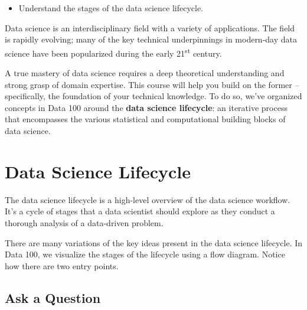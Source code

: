 \documentclass[
  letterpaper,
  DIV=11,
  numbers=noendperiod]{scrreprt}
\providecommand{\tightlist}{%
  \setlength{\itemsep}{0pt}\setlength{\parskip}{0pt}}\usepackage{longtable,booktabs,array}
\begin{document}
\begin{tcolorbox}[enhanced jigsaw, rightrule=.15mm, opacityback=0, colbacktitle=quarto-callout-note-color!10!white, opacitybacktitle=0.6, coltitle=black, toptitle=1mm, colback=white, toprule=.15mm, leftrule=.75mm, breakable, bottomtitle=1mm, bottomrule=.15mm, arc=.35mm, title=\textcolor{quarto-callout-note-color}{\faInfo}\hspace{0.5em}{Note}, colframe=quarto-callout-note-color-frame, titlerule=0mm, left=2mm]

\begin{itemize}
\tightlist
\item
  Understand the stages of the data science lifecycle.
\end{itemize}

\end{tcolorbox}

Data science is an interdisciplinary field with a variety of
applications. The field is rapidly evolving; many of the key technical
underpinnings in modern-day data science have been popularized during
the early 21\textsuperscript{st} century.

A true mastery of data science requires a deep theoretical understanding
and strong grasp of domain expertise. This course will help you build on
the former -- specifically, the foundation of your technical knowledge.
To do so, we've organized concepts in Data 100 around the \textbf{data
science lifecycle}: an iterative process that encompasses the various
statistical and computational building blocks of data science.

\hypertarget{data-science-lifecycle}{%
\section{Data Science Lifecycle}\label{data-science-lifecycle}}

The data science lifecycle is a high-level overview of the data science
workflow. It's a cycle of stages that a data scientist should explore as
they conduct a thorough analysis of a data-driven problem.

There are many variations of the key ideas present in the data science
lifecycle. In Data 100, we visualize the stages of the lifecycle using a
flow diagram. Notice how there are two entry points.

\hypertarget{ask-a-question}{%
\subsection{Ask a Question}\label{ask-a-question}}
\end{document}
